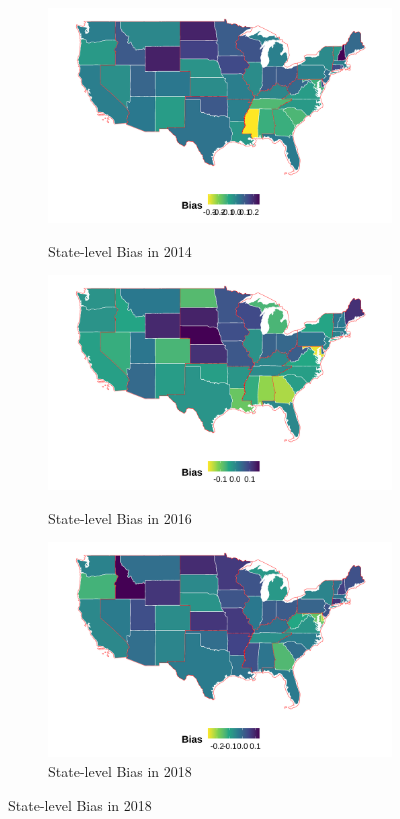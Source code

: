 \documentclass[12pt, fullpage]{article}
\begin{document}
\begin{center}
\begin{figure}[H]
\begin{subfigure}{.3\textwidth}
\label{fig:skiniat-map-2012}
\end{subfigure}
\hfill%
\begin{subfigure}{.3\textwidth}
\caption{State-level Bias in 2014}
\centering
\includegraphics[width=\linewidth]{figure/2014skinmap.png} 
\label{fig:skiniat-map-2014}
\end{subfigure}
\hfill%
\begin{subfigure}{.3\textwidth}
\caption{State-level Bias in 2016}
\centering
\includegraphics[width=\linewidth]{figure/2016skinmap.png} 
\label{fig:skiniat-map-2016}
\end{subfigure}
\hfill%
\begin{subfigure}{.3\textwidth}
\hspace{1cm}
\caption{State-level Bias in 2018}
\centering
\includegraphics[width=\linewidth]{figure/2018skinmap.png} 

\end{subfigure}
\end{figure}
\end{center}
\end{document}
